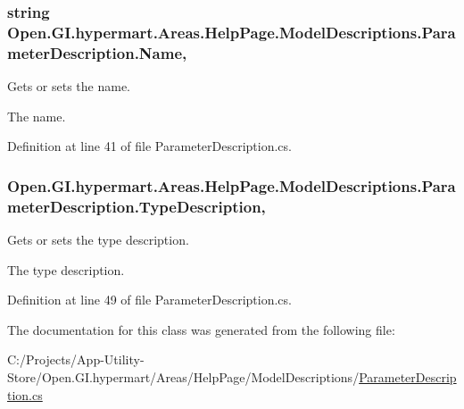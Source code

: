\subsubsection[{Name}]{\setlength{\rightskip}{0pt plus 5cm}string Open.\+G\+I.\+hypermart.\+Areas.\+Help\+Page.\+Model\+Descriptions.\+Parameter\+Description.\+Name\hspace{0.3cm}{\ttfamily [get]}, {\ttfamily [set]}}\label{class_open_1_1_g_i_1_1hypermart_1_1_areas_1_1_help_page_1_1_model_descriptions_1_1_parameter_description_a213cc3debc198eb331e57e38ecdca4ed}


Gets or sets the name. 

The name. 

Definition at line 41 of file Parameter\+Description.\+cs.

\hypertarget{class_open_1_1_g_i_1_1hypermart_1_1_areas_1_1_help_page_1_1_model_descriptions_1_1_parameter_description_a175a097aa553ad65ae87f136df0e24e7}{}
\subsubsection[{Type\+Description}]{ Open.\+G\+I.\+hypermart.\+Areas.\+Help\+Page.\+Model\+Descriptions.\+Parameter\+Description.\+Type\+Description\hspace{0.3cm}{\ttfamily [get]}, {\ttfamily [set]}}\label{class_open_1_1_g_i_1_1hypermart_1_1_areas_1_1_help_page_1_1_model_descriptions_1_1_parameter_description_a175a097aa553ad65ae87f136df0e24e7}


Gets or sets the type description. 

The type description. 

Definition at line 49 of file Parameter\+Description.\+cs.



The documentation for this class was generated from the following file\+:\begin{DoxyCompactItemize}
\item 
C\+:/\+Projects/\+App-\/\+Utility-\/\+Store/\+Open.\+G\+I.\+hypermart/\+Areas/\+Help\+Page/\+Model\+Descriptions/\hyperlink{_parameter_description_8cs}{Parameter\+Description.\+cs}\end{DoxyCompactItemize}
